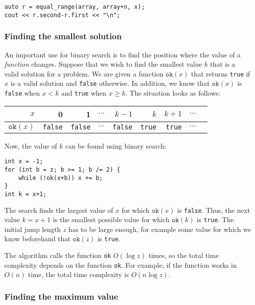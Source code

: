 \begin{lstlisting}
auto r = equal_range(array, array+n, x);
cout << r.second-r.first << "\n";
\end{lstlisting}

\subsubsection{Finding the smallest solution}

An important use for binary search is
to find the position where the value of a \emph{function} changes.
Suppose that we wish to find the smallest value $k$
that is a valid solution for a problem.
We are given a function $\texttt{ok}(x)$
that returns \texttt{true} if $x$ is a valid solution
and \texttt{false} otherwise.
In addition, we know that $\texttt{ok}(x)$ is \texttt{false}
when $x<k$ and \texttt{true} when $x \ge k$.
The situation looks as follows:

\begin{center}
\begin{tabular}{r|rrrrrrrr}
$x$ & 0 & 1 & $\cdots$ & $k-1$ & $k$ & $k+1$ & $\cdots$ \\
\hline
$\texttt{ok}(x)$ & \texttt{false} & \texttt{false}
& $\cdots$ & \texttt{false} & \texttt{true} & \texttt{true} & $\cdots$ \\
\end{tabular}
\end{center}

\noindent
Now, the value of $k$ can be found using binary search:

\begin{lstlisting}
int x = -1;
for (int b = z; b >= 1; b /= 2) {
    while (!ok(x+b)) x += b;
}
int k = x+1;
\end{lstlisting}

The search finds the largest value of $x$ for which
$\texttt{ok}(x)$ is \texttt{false}.
Thus, the next value $k=x+1$
is the smallest possible value for which
$\texttt{ok}(k)$ is \texttt{true}.
The initial jump length $z$ has to be
large enough, for example some value
for which we know beforehand that $\texttt{ok}(z)$ is \texttt{true}.

The algorithm calls the function \texttt{ok}
$O(\log z)$ times, so the total time complexity
depends on the function \texttt{ok}.
For example, if the function works in $O(n)$ time,
the total time complexity is $O(n \log z)$.

\subsubsection{Finding the maximum value}

